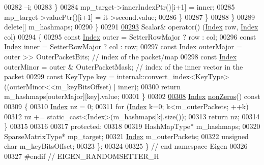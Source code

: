 \begin{DoxyCode}
00282               --i;
00283             \}
00284             mp\_target->innerIndexPtr()[i+1] = inner;
00285             mp\_target->valuePtr()[i+1] = it->second.value;
00286           \}
00287         \}
00288       \}
00289       \textcolor{keyword}{delete}[] m\_hashmaps;
00290     \}
00291 
\hyperlink{class_eigen_1_1_random_setter_a77dcbbc964b42027e00af269a5147c68}{00293}     Scalar& operator() (\hyperlink{namespace_eigen_a62e77e0933482dafde8fe197d9a2cfde}{Index} row, \hyperlink{namespace_eigen_a62e77e0933482dafde8fe197d9a2cfde}{Index} col)
00294     \{
00295       \textcolor{keyword}{const} \hyperlink{namespace_eigen_a62e77e0933482dafde8fe197d9a2cfde}{Index} outer = SetterRowMajor ? row : col;
00296       \textcolor{keyword}{const} \hyperlink{namespace_eigen_a62e77e0933482dafde8fe197d9a2cfde}{Index} inner = SetterRowMajor ? col : row;
00297       \textcolor{keyword}{const} \hyperlink{namespace_eigen_a62e77e0933482dafde8fe197d9a2cfde}{Index} outerMajor = outer >> OuterPacketBits; \textcolor{comment}{// index of the packet/map}
00298       \textcolor{keyword}{const} \hyperlink{namespace_eigen_a62e77e0933482dafde8fe197d9a2cfde}{Index} outerMinor = outer & OuterPacketMask;  \textcolor{comment}{// index of the inner vector in the packet}
00299       \textcolor{keyword}{const} KeyType key = internal::convert\_index<KeyType>((outerMinor<<m\_keyBitsOffset) | inner);
00300       \textcolor{keywordflow}{return} m\_hashmaps[outerMajor][key].value;
00301     \}
00302 
\hyperlink{class_eigen_1_1_random_setter_ac34e5cd67e370641c3b48c8a91705046}{00308}     \hyperlink{namespace_eigen_a62e77e0933482dafde8fe197d9a2cfde}{Index} \hyperlink{class_eigen_1_1_random_setter_ac34e5cd67e370641c3b48c8a91705046}{nonZeros}()\textcolor{keyword}{ const}
00309 \textcolor{keyword}{    }\{
00310       \hyperlink{namespace_eigen_a62e77e0933482dafde8fe197d9a2cfde}{Index} nz = 0;
00311       \textcolor{keywordflow}{for} (\hyperlink{namespace_eigen_a62e77e0933482dafde8fe197d9a2cfde}{Index} k=0; k<m\_outerPackets; ++k)
00312         nz += static\_cast<Index>(m\_hashmaps[k].size());
00313       \textcolor{keywordflow}{return} nz;
00314     \}
00315 
00316 
00317   \textcolor{keyword}{protected}:
00318 
00319     HashMapType* m\_hashmaps;
00320     SparseMatrixType* mp\_target;
00321     \hyperlink{namespace_eigen_a62e77e0933482dafde8fe197d9a2cfde}{Index} m\_outerPackets;
00322     \textcolor{keywordtype}{unsigned} \textcolor{keywordtype}{char} m\_keyBitsOffset;
00323 \};
00324 
00325 \} \textcolor{comment}{// end namespace Eigen}
00326 
00327 \textcolor{preprocessor}{#endif // EIGEN\_RANDOMSETTER\_H}
\end{DoxyCode}
